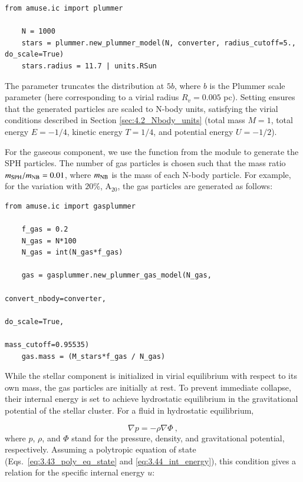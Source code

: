 \begin{lstlisting}[caption=Stars particles in model A, label=lst:stars_part_A]
	from amuse.ic import plummer
	
	N = 1000
	stars = plummer.new_plummer_model(N, converter, radius_cutoff=5., do_scale=True)
	stars.radius = 11.7 | units.RSun
\end{lstlisting}

The  parameter truncates the distribution at $5b$, where $b$ is the Plummer scale parameter (here corresponding to a virial radius $R_v = 0.005$ pc). Setting  ensures that the generated particles are scaled to N-body units, satisfying the virial conditions described in Section \ref{sec:4.2_Nbody_units} (total mass $M=1$, total energy $E=-1/4$, kinetic energy $T=1/4$, and potential energy $U=-1/2$).

For the gaseous component, we use the  function from the  module to generate the SPH particles. The number of gas particles is chosen such that the mass ratio $m_{\rm SPH} / m_{\rm NB} = 0.01$, where $m_{\rm NB}$ is the mass of each N-body particle. For example, for the variation with $20\%$, A$_{20}$, the gas particles are generated as follows:

\begin{lstlisting}[caption=Gas particles in model A, label=lst:gas_part_A]
	from amuse.ic import gasplummer
	
	f_gas = 0.2
	N_gas = N*100
	N_gas = int(N_gas*f_gas)
	
	gas = gasplummer.new_plummer_gas_model(N_gas, 
	                                                             convert_nbody=converter, 
	                                                             do_scale=True, 
	                                                             mass_cutoff=0.95535)
	gas.mass = (M_stars*f_gas / N_gas)
\end{lstlisting}

While the stellar component is initialized in virial equilibrium with respect to its own mass, the gas particles are initially at rest. To prevent immediate collapse, their internal energy is set to achieve hydrostatic equilibrium in the gravitational potential of the stellar cluster. For a fluid in hydrostatic equilibrium,

\begin{equation}
	\nabla p = - \rho \nabla \Phi~,
\end{equation}
where $p$, $\rho$, and $\Phi$ stand for the pressure, density, and gravitational potential, respectively. Assuming a polytropic equation of state (Eqs.~\eqref{eq:3.43_poly_eq_state} and \eqref{eq:3.44_int_energy}), this condition gives a relation for the specific internal energy $u$:

